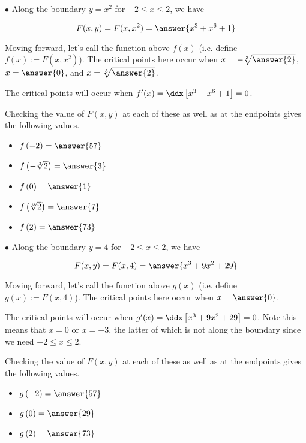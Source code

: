 \documentclass{ximera}
\begin{document}
\begin{exercise}
\begin{exercise}
\begin{exercise}
\begin{exercise}
$\bullet$ Along the boundary $y=x^2$ for $-2 \leq x \leq 2$, we have

\[
F(x,y) = F(x,x^2) = \answer{  x^3 + x^6 +1 }
\]

Moving forward, let's call the function above $f(x)$ (i.e. define $f(x) := F(x,x^2)$).  The critical points here occur when $x=-\sqrt[3]{\answer{2}}$, $x=\answer{0}$, and $x=\sqrt[3]{\answer{2}}$.

\begin{hint}
The critical points will occur when $f'(x) = \ddx \left[  x^3 + x^6 +1 \right] =0$.
\end{hint}

\begin{exercise}
Checking the value of $F(x,y)$ at each of these as well as at the endpoints gives the following values.

\begin{itemize}
\item $f\left(-2\right) = \answer{57}$
\item $f\left(-\sqrt[3]{2}\right) = \answer{3}$
\item $f\left(0\right) = \answer{1}$
\item $f\left(\sqrt[3]{2}  \right) = \answer{7}$
\item $f\left(2 \right) = \answer{73}$
\end{itemize}

\end{exercise}

$\bullet$ Along the boundary $y=4$ for $-2 \leq x \leq 2$, we have

\[
F(x,y) = F(x,4) = \answer{  x^3+9x^2 + 29 }
\]

Moving forward,  let's call the function above $g(x)$ (i.e. define $g(x) := F(x,4)$).    The critical points here occur when $x=\answer{0}$.

\begin{hint}
The critical points will occur when $g'(x) = \ddx \left[ x^3+9x^2 + 29 \right] =0$.  Note this means that $x=0$ or $x=-3$, the latter of which is not along the boundary since we need $-2 \leq x \leq 2$.

\end{hint}

\begin{exercise}
Checking the value of $F(x,y)$ at each of these as well as at the endpoints gives the following values.

\begin{itemize}
\item $g\left(-2\right) = \answer{57}$
\item $g\left(0 \right) = \answer{29}$
\item $g\left(2 \right) = \answer{73}$
\end{itemize}



\end{exercise}
\end{exercise}
\end{exercise}
\end{exercise}
\end{exercise}
\end{document}
